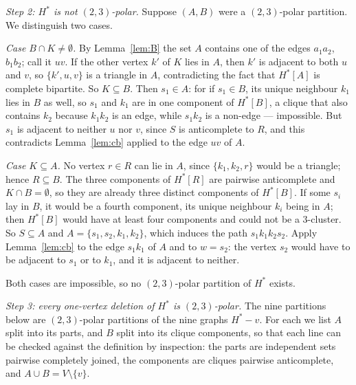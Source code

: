 \documentclass[11pt]{amsart}
\theoremstyle{definition}
\theoremstyle{remark}
\newcommand{\Hstar}{H^{*}}
\begin{document}
\medskip
\noindent\emph{Step 2: $\Hstar$ is not $(2,3)$-polar.}
Suppose $(A,B)$ were a $(2,3)$-polar partition. We distinguish two cases.

\emph{Case $B\cap K\ne\emptyset$.} By Lemma~\ref{lem:B} the set $A$ contains one of the edges
$a_1a_2$, $b_1b_2$; call it $uv$. If the other vertex $k'$ of $K$ lies in $A$, then $k'$ is
adjacent to both $u$ and $v$, so $\{k',u,v\}$ is a triangle in $A$, contradicting the fact that
$\Hstar[A]$ is complete bipartite. So $K\subseteq B$. Then $s_1\in A$: for if $s_1\in B$, its
unique neighbour $k_1$ lies in $B$ as well, so $s_1$ and $k_1$ are in one component of
$\Hstar[B]$, a clique that also contains $k_2$ because $k_1k_2$ is an edge, while $s_1k_2$ is a
non-edge --- impossible. But $s_1$ is adjacent to neither $u$ nor $v$, since $S$ is
anticomplete to $R$, and this contradicts Lemma~\ref{lem:cb} applied to the edge $uv$ of $A$.

\emph{Case $K\subseteq A$.} No vertex $r\in R$ can lie in $A$, since $\{k_1,k_2,r\}$ would be a
triangle; hence $R\subseteq B$. The three components of $\Hstar[R]$ are pairwise anticomplete
and $K\cap B=\emptyset$, so they are already three distinct components of $\Hstar[B]$. If some
$s_i$ lay in $B$, it would be a fourth component, its unique neighbour $k_i$ being in $A$; then
$\Hstar[B]$ would have at least four components and could not be a $3$-cluster. So
$S\subseteq A$ and $A=\{s_1,s_2,k_1,k_2\}$, which induces the path $s_1k_1k_2s_2$. Apply
Lemma~\ref{lem:cb} to the edge $s_1k_1$ of $A$ and to $w=s_2$: the vertex $s_2$ would have to be
adjacent to $s_1$ or to $k_1$, and it is adjacent to neither.

Both cases are impossible, so no $(2,3)$-polar partition of $\Hstar$ exists.

\medskip
\noindent\emph{Step 3: every one-vertex deletion of $\Hstar$ is $(2,3)$-polar.}
The nine partitions below are $(2,3)$-polar partitions of the nine graphs $\Hstar-v$. For each
we list $A$ split into its parts, and $B$ split into its clique components, so that each line
can be checked against the definition by inspection: the parts are independent sets pairwise
completely joined, the components are cliques pairwise anticomplete, and $A\cup B=V\setminus
\{v\}$.
\end{document}
